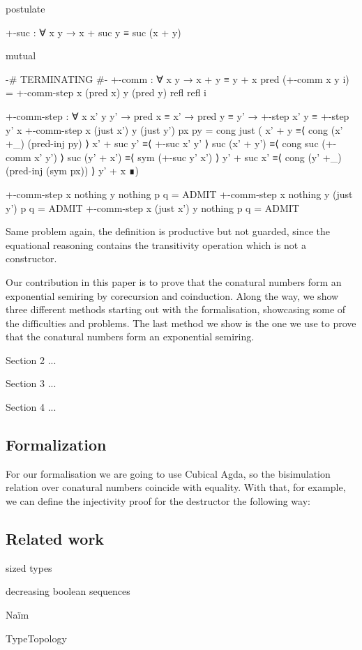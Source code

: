 \begin{code}[hide]
postulate
\end{code}
\begin{code}
  +-suc : ∀ x y → x + suc y ≡ suc (x + y)
\end{code}

\begin{code}[hide]
mutual
\end{code}
\begin{code}
  {-# TERMINATING #-}
  +-comm : ∀ x y → x + y ≡ y + x
  pred (+-comm x y i) =
    +-comm-step x (pred x) y (pred y) refl refl i

  +-comm-step :
    ∀ x x' y y' → pred x ≡ x' → pred y ≡ y' →
    +-step x' y ≡ +-step y' x
  +-comm-step x (just x') y (just y') px py =
    cong just
      ( x' + y         ≡⟨ cong (x' +_) (pred-inj py) ⟩
        x' + suc y'    ≡⟨ +-suc x' y' ⟩
        suc (x' + y')  ≡⟨ cong suc (+-comm x' y') ⟩
        suc (y' + x')  ≡⟨ sym (+-suc y' x') ⟩
        y' + suc x'    ≡⟨ cong (y' +_) (pred-inj (sym px)) ⟩
        y' + x         ∎)
\end{code}
\begin{code}[hide]
  +-comm-step x nothing y nothing p q = ADMIT
  +-comm-step x nothing y (just y') p q = ADMIT
  +-comm-step x (just x') y nothing p q = ADMIT
\end{code}

Same problem again, the definition is productive but not guarded, since the
equational reasoning contains the transitivity operation which is not a
constructor.

Our contribution in this paper is to prove that the conatural numbers form an
exponential semiring by corecursion and coinduction. Along the way, we show
three different methods starting out with the formalisation, showcasing some of
the difficulties and problems. The last method we show is the one we use to
prove that the conatural numbers form an exponential semiring.

Section 2 ...

Section 3 ...

Section 4 ...

\subsection{Formalization}

For our formalisation we are going to use Cubical Agda, so the bisimulation
relation over conatural numbers coincide with equality. With that, for example,
we can define the injectivity proof for the  destructor the
following way:

\subsection{Related work}

sized types

decreasing boolean sequences

Naïm

TypeTopology

